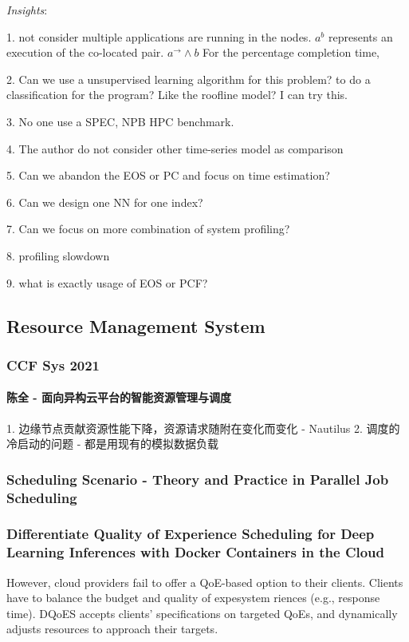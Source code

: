 \documentclass[UTF8]{article}
\begin{document}
\emph{Insights}: 

1. not consider multiple applications are running in the nodes. $a^b$ represents an execution of the co-located pair. $a^{\rightarrow} \wedge b$ For the percentage completion time, 

2. Can we use a unsupervised learning algorithm for this problem?  to do a classification for the program?  Like the roofline model? I can try this.

3. No one use a SPEC, NPB HPC benchmark.

4. The author do not consider other time-series model as comparison

5. Can we abandon the EOS or PC and focus on time estimation?

6. Can we design one NN for one index?

7. Can we focus on more combination of system profiling?

8. profiling slowdown

9. what is exactly usage of EOS or PCF?

\subsection{Resource Management System}
\subsubsection{CCF Sys 2021}
\paragraph{陈全 - 面向异构云平台的智能资源管理与调度}
1. 边缘节点贡献资源性能下降，资源请求随附在变化而变化 - Nautilus
2. 调度的冷启动的问题 - 都是用现有的模拟数据负载


\subsubsection{Scheduling Scenario - Theory and Practice in Parallel Job Scheduling}
\subsubsection{Differentiate Quality of Experience Scheduling for Deep Learning Inferences with Docker Containers in the Cloud}
However, cloud providers fail to offer a QoE-based option to their clients. Clients have to balance the budget and quality of expesystem
riences (e.g., response time). DQoES accepts clients’ specifications on targeted QoEs, and dynamically adjusts resources to approach their targets. 
\end{document}
